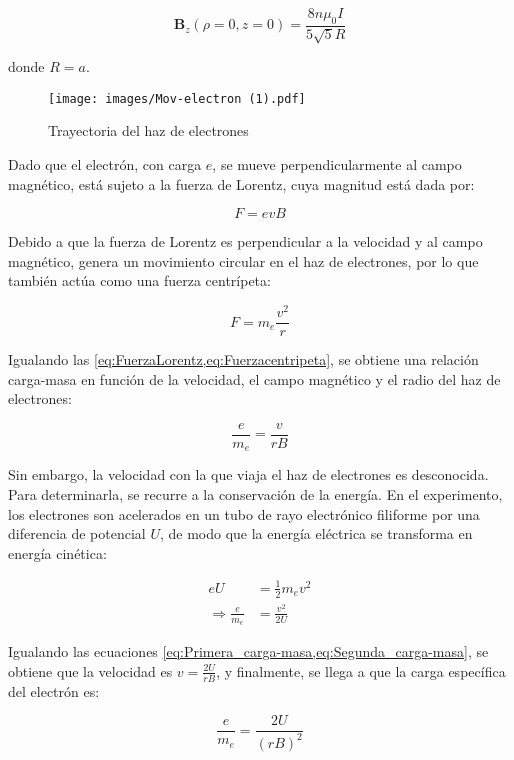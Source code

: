 \begin{equation}
    \mathbf{B}_{z}(\rho=0, z=0) = \frac{8 n \mu_{0} I}{5 \sqrt{5} R}
    \label{eq:Campo_magnetico_enHaz}
\end{equation}

donde \( R = a \).

\begin{figure}[H]
    \centering
    \texttt{[image: images/Mov-electron (1).pdf]}
    \caption{Trayectoria del haz de electrones}
    \label{fig:haz_elelctrones}
\end{figure}

Dado que el electrón, con carga \( e \), se mueve perpendicularmente al campo magnético, está sujeto a la fuerza de Lorentz, cuya magnitud está dada por:

\begin{equation}
    F = e v B
    \label{eq:FuerzaLorentz}
\end{equation}

Debido a que la fuerza de Lorentz es perpendicular a la velocidad y al campo magnético, genera un movimiento circular en el haz de electrones, por lo que también actúa como una fuerza centrípeta:

\begin{equation}
    F = m_{e} \frac{v^{2}}{r}
    \label{eq:Fuerzacentripeta}
\end{equation}

Igualando las \cref{eq:FuerzaLorentz,eq:Fuerzacentripeta}, se obtiene una relación carga-masa en función de la velocidad, el campo magnético y el radio del haz de electrones:

\begin{equation}
    \frac{e}{m_{e}} = \frac{v}{r B}
    \label{eq:Primera_carga-masa}
\end{equation}

Sin embargo, la velocidad con la que viaja el haz de electrones es desconocida. Para determinarla, se recurre a la conservación de la energía. En el experimento, los electrones son acelerados en un tubo de rayo electrónico filiforme por una diferencia de potencial \( U \), de modo que la energía eléctrica se transforma en energía cinética:

\begin{equation}
\begin{aligned}
    e U &= \frac{1}{2} m_{e} v^{2} \\
    \Rightarrow \frac{e}{m_{e}} &= \frac{v^{2}}{2 U}
\end{aligned}
\label{eq:Segunda_carga-masa}
\end{equation}

Igualando las ecuaciones \cref{eq:Primera_carga-masa,eq:Segunda_carga-masa}, se obtiene que la velocidad es \( v = \frac{2 U}{r B} \), y finalmente, se llega a que la carga específica del electrón es: \cite{leybold_experimentos}

\begin{equation}
    \frac{e}{m_{e}} = \frac{2 U}{(r B)^{2}}
    \label{eq:carga-masa}
\end{equation}







